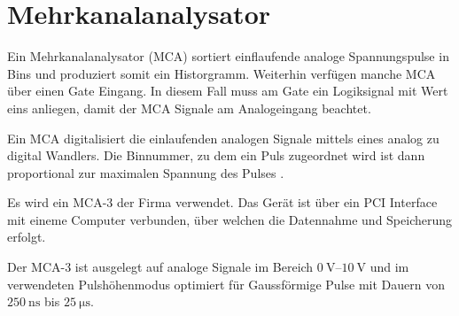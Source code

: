 \section{Mehrkanalanalysator}

Ein Mehrkanalanalysator (MCA) sortiert einflaufende analoge Spannungspulse in Bins und produziert somit ein Historgramm. Weiterhin verfügen manche MCA über einen Gate Eingang. In diesem Fall muss am Gate ein Logiksignal mit Wert eins anliegen, damit der MCA Signale am Analogeingang beachtet.

Ein MCA digitalisiert die einlaufenden analogen Signale mittels eines analog zu digital Wandlers. Die Binnummer, zu dem ein Puls zugeordnet wird ist dann proportional zur maximalen Spannung des Pulses \cite[291]{leotechniques}.


Es wird ein MCA-3 der Firma  verwendet. Das Gerät ist über ein PCI Interface mit eineme Computer verbunden, über welchen die Datennahme und Speicherung erfolgt\cite{mca}.

Der MCA-3 ist ausgelegt auf analoge Signale im Bereich $\SIrange{0}{10}{\volt}$ und im verwendeten Pulshöhenmodus optimiert für Gaussförmige Pulse mit Dauern von $\SI{250}{\nano\second}$ bis $\SI{25}{\micro\second}$\cite[Abs. 3.2.2]{mca}.
